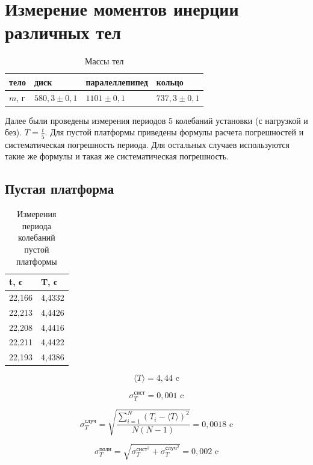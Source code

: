 \documentclass[a4paper, 12pt]{article}
\begin{document}
\section*{Измерение моментов инерции различных тел}

\begin{table}[!ht]
    \centering
    \begin{tabular}{|l|l|l|l|}
    \hline
        тело & диск & паралеллепипед & кольцо \\ \hline
        $m$, г & $580,3 \pm 0,1$ & $1101 \pm 0,1$ & $737,3 \pm 0,1$ \\ \hline
    \end{tabular}
    \caption{Массы тел}
\end{table}

Далее были проведены измерения периодов 5 колебаний установки (с нагрузкой и без). $T = \frac{t}{5}$. Для пустой платформы приведены формулы расчета погрешностей и систематическая погрешность периода. Для остальных случаев используются такие же формулы и такая же систематическая погрешность.

\subsection*{Пустая платформа}

\begin{table}
    \centering
    \begin{tabular}{|l|l|}
    \hline
        t, с & T, с \\ \hline
        22,166 & 4,4332 \\ \hline
        22,213 & 4,4426 \\ \hline
        22,208 & 4,4416 \\ \hline
        22,211 & 4,4422 \\ \hline
        22,193 & 4,4386 \\ \hline
    \end{tabular}
    \caption{Измерения периода колебаний пустой платформы}
\end{table}

\[ \langle T \rangle = 4,44 \text{ c}\]

\[ \sigma_T^{\text{сист}} = 0,001 \text{ c}\]

\[ \sigma_T^{\text{случ}} = \sqrt{\frac{\sum_{i=1}^{N}(T_i-\langle T \rangle)^2}{N(N-1)}} = 0,0018 \text{ c}\]

\[ \sigma_T^{\text{полн}} = \sqrt{\sigma_T^{{\text{сист}}^2}+\sigma_T^{{\text{случ}}^2}} = 0,002 \text{ c}\]
\end{document}
